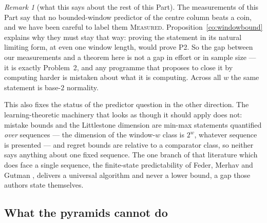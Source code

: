 \documentclass[11pt]{article}
\theoremstyle{definition}
\theoremstyle{remark}
\newtheorem{remark}[theorem]{Remark}
\newcommand{\MEASURED}{\textsc{Measured}}
\begin{document}
\begin{remark}[what this says about the rest of this Part]\label{co:windowbound:read}
The measurements of this Part say that no bounded-window predictor of the centre column beats a coin,
and we have been careful to label them \MEASURED. Proposition~\ref{co:windowbound} explains why they
must stay that way: proving the statement in its natural limiting form, at even one window length,
would prove P2. So the gap between our measurements and a theorem here is not a gap in effort or in
sample size --- it is exactly Problem~2, and any programme that proposes to close it by computing
harder is mistaken about what it is computing. Across all $w$ the same statement is base-$2$
normality.

This also fixes the status of the predictor question in the other direction. The learning-theoretic
machinery that looks as though it should apply does not: mistake bounds and the Littlestone dimension
are min-max statements quantified \emph{over} sequences --- the dimension of the window-$w$ class is
$2^{w}$, whatever sequence is presented --- and regret bounds are relative to a comparator class, so
neither says anything about one fixed sequence. The one branch of that literature which does face a
single sequence, the finite-state predictability of Feder, Merhav and Gutman \cite{FMG}, delivers a universal
algorithm and never a lower bound, a gap those authors state themselves.
\end{remark}

\subsection{What the pyramids cannot do}
\end{document}
